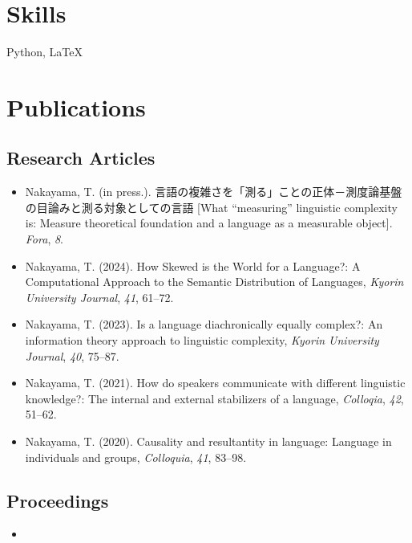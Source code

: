 \documentclass[a4paper,11pt]{article}
\begin{document}
\vspace{1em}

\section*{Skills}
  \hspace{0.5em} Python, \LaTeX

\vspace{1em}

\section*{Publications}
\subsection*{Research Articles}
\begin{itemize}[leftmargin=*, itemsep=0em, topsep=0em]
  \item Nakayama, T. (in press.). 言語の複雑さを「測る」ことの正体－測度論基盤の目論みと測る対象としての言語 [What ``measuring'' linguistic complexity is: Measure theoretical foundation and a language as a measurable object]. \textit{Fora}, \textit{8}. 
  \item  Nakayama, T. (2024). How Skewed is the World for a Language?: A Computational Approach to the Semantic Distribution of Languages, \textit{Kyorin University Journal}, \textit{41}, 61–72. 
  \item Nakayama, T. (2023). Is a language diachronically equally complex?: An information theory approach to linguistic complexity, \textit{Kyorin University Journal}, \textit{40}, 75–87. 
  \item Nakayama, T. (2021). How do speakers communicate with different linguistic knowledge?: The internal and external stabilizers of a language, \textit{Colloqia}, \textit{42}, 51–62.
  \item Nakayama, T. (2020). Causality and resultantity in language: Language in individuals and groups, \textit{Colloquia}, \textit{41}, 83–98.
\end{itemize}

\subsection*{Proceedings}
\begin{itemize}[leftmargin=*, itemsep=0em, topsep=0em]
  \item 
\end{itemize}
\end{document}
